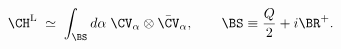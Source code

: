 \begin{equation}\label{spec}
\CH^{\rm L}\;\simeq\; \int_{\BS}d\alpha \;\CV_{\alpha}\otimes\bar{\CV}_{\alpha}
,\qquad\BS\equiv \frac{Q}{2}+i\BR^+.
\end{equation}

